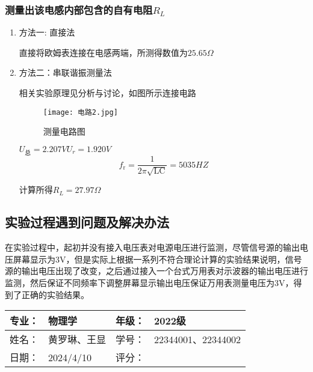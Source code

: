 \documentclass[dvipsnames, svgnames,a4paper,11pt]{article}
\begin{document}
	\subsubsection{测量出该电感内部包含的自有电阻$R_L$}
	\begin{enumerate}
		\item 方法一:
		直接法

		直接将欧姆表连接在电感两端，所测得数值为$25.65\Omega$
		\item 方法二：串联谐振测量法
		
	    相关实验原理见分析与讨论，如图所示连接电路
		\begin{figure}[{H}]
			\centering
			\texttt{[image: 电路2.jpg]}
			\caption{测量电路图}
			\label{}
		\end{figure}

		$U_{总}=2.207V$\quad$U_r=1.920V$  $$f_{\mathrm{r}}=\frac1{2\pi\sqrt{\mathrm{LC}}}=5035HZ$$
		
		
	计算所得$R_L=27.97\Omega$
	\end{enumerate}
	
	
	
	\subsection{实验过程遇到问题及解决办法}
	
		在实验过程中，起初并没有接入电压表对电源电压进行监测，尽管信号源的输出电压屏幕显示为3V，但是实际上根据一系列不符合理论计算的实验结果说明，信号源的输出电压出现了改变，之后通过接入一个台式万用表对示波器的输出电压进行监测，然后保证不同频率下调整屏幕显示输出电压保证万用表测量电压为3V，得到了正确的实验结果。
	
	
	
	
	\clearpage
	
	\begin{table}
		\renewcommand\arraystretch{1.7}
		\begin{tabularx}{\textwidth}{|X|X|X|X|}
			\hline
			专业：& 物理学 &年级：& 2022级\\
			\hline
			姓名： &黄罗琳、王显  & 学号：&22344001、22344002 \\
			\hline
			日期：& 2024/4/10 & 评分： &\\
			\hline
		\end{tabularx}
	\end{table}
	
\end{document}
